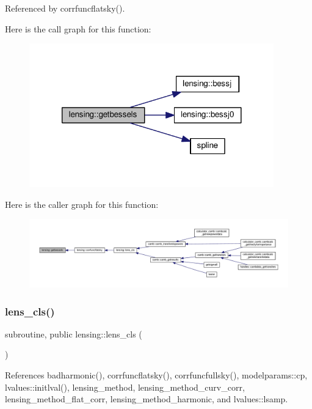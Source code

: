 Referenced by corrfuncflatsky().

Here is the call graph for this function\+:
\nopagebreak
\begin{figure}[H]
\begin{center}
\leavevmode
\includegraphics[width=300pt]{namespacelensing_a208c6bffe402d39685fb2f4509de310c_cgraph}
\end{center}
\end{figure}
Here is the caller graph for this function\+:
\nopagebreak
\begin{figure}[H]
\begin{center}
\leavevmode
\includegraphics[width=350pt]{namespacelensing_a208c6bffe402d39685fb2f4509de310c_icgraph}
\end{center}
\end{figure}
\mbox{\label{namespacelensing_a71d315283bcce7fb9626733365bf43e6}} 
\subsubsection{\texorpdfstring{lens\+\_\+cls()}{lens\_cls()}}
{\footnotesize\ttfamily subroutine, public lensing\+::lens\+\_\+cls (\begin{DoxyParamCaption}{ }\end{DoxyParamCaption})}



References badharmonic(), corrfuncflatsky(), corrfuncfullsky(), modelparams\+::cp, lvalues\+::initlval(), lensing\+\_\+method, lensing\+\_\+method\+\_\+curv\+\_\+corr, lensing\+\_\+method\+\_\+flat\+\_\+corr, lensing\+\_\+method\+\_\+harmonic, and lvalues\+::lsamp.



